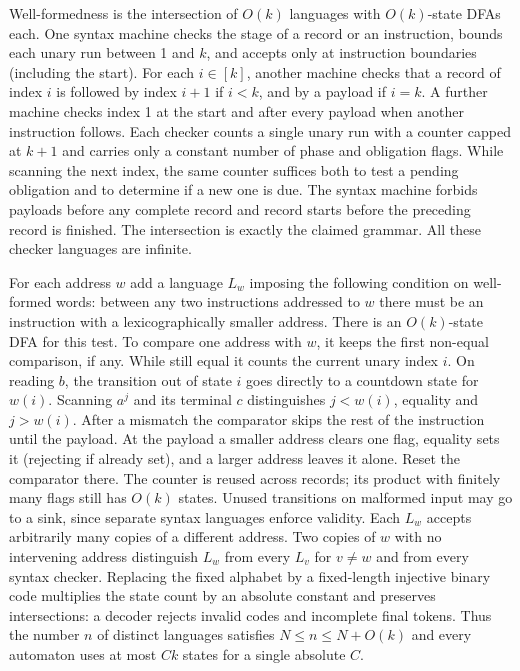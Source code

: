 \documentclass[11pt]{article}
\begin{document}
Well-formedness is the intersection of $O(k)$ languages with $O(k)$-state DFAs each. One syntax machine checks the stage of a record or an instruction, bounds each unary run between 1 and $k$, and accepts only at instruction boundaries (including the start). For each $i\in[k]$, another machine checks that a record of index $i$ is followed by index $i+1$ if $i<k$, and by a payload if $i=k$. A further machine checks index 1 at the start and after every payload when another instruction follows. Each checker counts a single unary run with a counter capped at $k+1$ and carries only a constant number of phase and obligation flags. While scanning the next index, the same counter suffices both to test a pending obligation and to determine if a new one is due. The syntax machine forbids payloads before any complete record and record starts before the preceding record is finished. The intersection is exactly the claimed grammar. All these checker languages are infinite.

For each address $w$ add a language $L_w$ imposing the following condition on well-formed words: between any two instructions addressed to $w$ there must be an instruction with a lexicographically smaller address. There is an $O(k)$-state DFA for this test. To compare one address with $w$, it keeps the first non-equal comparison, if any. While still equal it counts the current unary index $i$. On reading $b$, the transition out of state $i$ goes directly to a countdown state for $w(i)$. Scanning $a^j$ and its terminal $c$ distinguishes $j<w(i)$, equality and $j>w(i)$. After a mismatch the comparator skips the rest of the instruction until the payload. At the payload a smaller address clears one flag, equality sets it (rejecting if already set), and a larger address leaves it alone. Reset the comparator there. The counter is reused across records; its product with finitely many flags still has $O(k)$ states. Unused transitions on malformed input may go to a sink, since separate syntax languages enforce validity. Each $L_w$ accepts arbitrarily many copies of a different address. Two copies of $w$ with no intervening address distinguish $L_w$ from every $L_v$ for $v\ne w$ and from every syntax checker. Replacing the fixed alphabet by a fixed-length injective binary code multiplies the state count by an absolute constant and preserves intersections: a decoder rejects invalid codes and incomplete final tokens. Thus the number $n$ of distinct languages satisfies $N\le n\le N+O(k)$ and every automaton uses at most $Ck$ states for a single absolute $C$.
\end{document}
